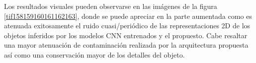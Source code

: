 \documentclass[10pt,letterpaper]{article}
\begin{document}
Los resultados visuales pueden observarse en las imágenes de la figura \ref{tif158159160161162163}, donde se puede apreciar en la parte aumentada como es atenuada exitosamente el ruido cuasi/periódico de las representaciones 2D de los objetos inferidos por los modelos CNN entrenados y el propuesto. Cabe resaltar una mayor atenuación de contaminación realizada por la arquitectura propuesta así como una conservación mayor de los detalles del objeto. 

\begin{figure}[H]
      \begin{center}
\end{center}
\end{figure}
\end{document}
